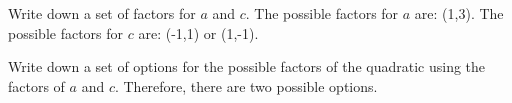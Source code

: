 {\begin{mdframed}[linewidth=4, leftmargin=40, rightmargin=40]
\begin{exercise}
\begin{enumerate}[noitemsep, label=\textbf{Step} \textbf{\arabic*}. ]
{    }%
        \label{m39394*id277035}Write down a set of factors for $a$ and $c$.
The possible factors for $a$ are: (1,3).
The possible factors for $c$ are: (-1,1) or (1,-1).\par 
        \label{m39394*id277075}Write down a set of options for the possible factors of the quadratic using the factors of $a$ and $c$.
Therefore, there are two possible options.\par 
    \setlength\mytablespace{4\tabcolsep}
    \addtolength\mytablespace{3\arrayrulewidth}
    \setlength\mytablewidth{\linewidth}
    \setlength\mytableroom{\mytablewidth}
    \addtolength\mytableroom{-\mytablespace}
    \setlength\myfixedwidth{0pt}
    \setlength\mystarwidth{\mytableroom}
        \addtolength\mystarwidth{-\myfixedwidth}
        \divide{}
\end{enumerate}
\end{exercise}
\end{mdframed}}
